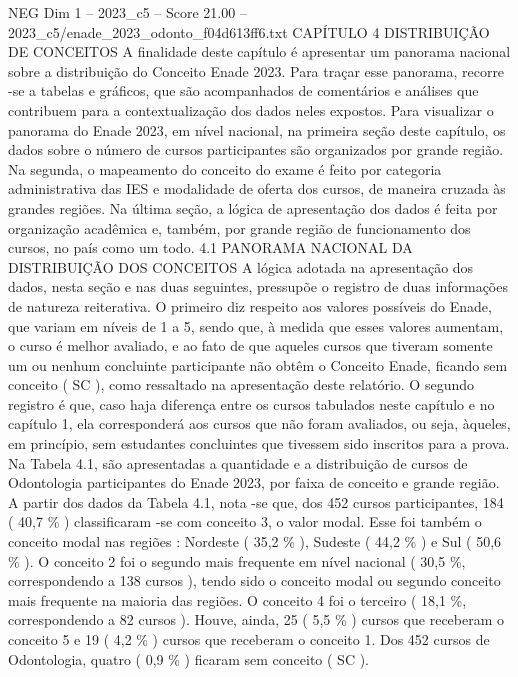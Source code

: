 \begin{textsample}{NEG Dim 1 – 2023\_c5 – Score 21.00 – 2023\_c5/enade\_2023\_odonto\_f04d613ff6.txt}  \label{ex:f1_neg_426}
CAPÍTULO 4 DISTRIBUIÇÃO DE CONCEITOS A finalidade deste capítulo é apresentar um panorama nacional sobre a distribuição do Conceito Enade 2023.
Para traçar esse panorama, recorre -se a tabelas e gráficos, que são acompanhados de comentários e análises que contribuem para a contextualização dos dados neles expostos.
Para visualizar o panorama do Enade 2023, em nível nacional, na primeira seção deste capítulo, os dados sobre o número de cursos participantes são organizados por grande região.
Na segunda, o mapeamento do conceito do exame é feito por categoria administrativa das IES e modalidade de oferta dos cursos, de maneira cruzada às grandes regiões.
Na última seção, a lógica de apresentação dos dados é feita por organização acadêmica e, também, por grande região de funcionamento dos cursos, no país como um todo. 4.1 PANORAMA NACIONAL DA DISTRIBUIÇÃO DOS CONCEITOS A lógica adotada na apresentação dos dados, nesta seção e nas duas seguintes, pressupõe o registro de duas informações de natureza reiterativa.
O primeiro diz respeito aos valores possíveis do Enade, que variam em níveis de 1 a 5, sendo que, à medida que esses valores aumentam, o curso é melhor avaliado, e ao fato de que aqueles cursos que tiveram somente um ou nenhum concluinte participante não obtêm o Conceito Enade, ficando sem conceito ( SC ), como ressaltado na apresentação deste relatório.
O segundo registro é que, caso haja diferença entre os cursos tabulados neste capítulo e no capítulo 1, ela corresponderá aos cursos que não foram avaliados, ou seja, àqueles, em princípio, sem estudantes concluintes que tivessem sido inscritos para a prova.
Na Tabela 4.1, são apresentadas a quantidade e a distribuição de cursos de Odontologia participantes do Enade 2023, por faixa de conceito e grande região.
A partir dos dados da Tabela 4.1, nota -se que, dos 452 cursos participantes, 184 ( 40,7 \% ) classificaram -se com conceito 3, o valor modal.
Esse foi também o conceito modal nas regiões : Nordeste ( 35,2 \% ), Sudeste ( 44,2 \% ) e Sul ( 50,6 \% ).
O conceito 2 foi o segundo mais frequente em nível nacional ( 30,5 \%, correspondendo a 138 cursos ), tendo sido o conceito modal ou segundo conceito mais frequente na maioria das regiões.
O conceito 4 foi o terceiro ( 18,1 \%, correspondendo a 82 cursos ).
Houve, ainda, 25 ( 5,5 \% ) cursos que receberam o conceito 5 e 19 ( 4,2 \% ) cursos que receberam o conceito 1.
Dos 452 cursos de Odontologia, quatro ( 0,9 \% ) ficaram sem conceito ( SC ).

\end{textsample}
